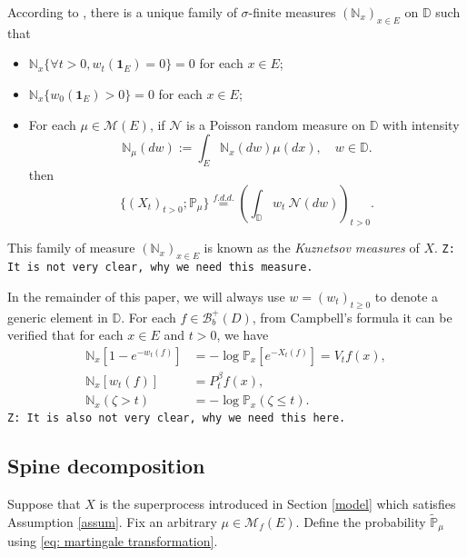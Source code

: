 \documentclass[12pt,a4paper]{amsart}
\numberwithin{equation}{section}
\theoremstyle{plain}
\theoremstyle{definition}
\theoremstyle{remark}
\begin{document}
	According to \cite[Section 8.4]{Li2011Measure-valued}, there is a unique family of $\sigma$-finite measures $(\mathbb N_x)_{x\in E}$ on $\mathbb D$ such that
\begin{itemize}
\item
    $\mathbb N_x \{\forall t > 0, w_t(\mathbf 1_E)=0\} =0$ for each $x\in E$;
\item
    $\mathbb N_x \{ w_0(\mathbf 1_E) > 0\} = 0$ for each $x\in E$;
\item
    For each $\mu \in \mathcal M(E)$, if $\mathcal N$ is a Poisson random measure on $\mathbb D$ with intensity
\[
	\mathbb N_\mu(dw):= \int_E \mathbb N_x(dw)\mu(dx), \quad w\in \mathbb D.
\]
	then
\[
	\{(X_t)_{t> 0};\mathbb P_\mu\}
	\overset{f.d.d.}{=} \left(\int_{\mathbb D} w_t~\mathcal N(dw)\right)_{t> 0}.
\]
\end{itemize}
	This family of measure $(\mathbb N_x)_{x\in E}$ is known as the \emph{Kuznetsov measures} of $X$.
	{\tt Z: It is not very clear, why we need this measure.}

	In the remainder of this paper, we will always use $w = (w_t)_{t\geq 0}$ to denote a generic element in $\mathbb D$.
	For each $f\in \mathcal B_b^+(D)$, from Campbell's formula it can be verified that for each $x\in E$ and $t>0$, we have
\begin{align}\label{eq: kuznetsov Laplace}
 	\mathbb N_x[1-e^{-w_t(f) }]
 	&=-\log \mathbb P_x[e^{-X_t(f)}] = V_t f(x),
 	\\ \mathbb N_x[w_t(f)]
 	&=P_t^{\beta}f(x),
 	\\
 \mathbb N_x(\zeta > t) &= - \log \mathbb P_x(\zeta \leq t).
\end{align}
	{\tt Z: It is also not very clear, why we need this here.}


\subsection{Spine decomposition}
    Suppose that $X$ is the superprocess introduced in Section \ref{model} which satisfies Assumption \ref{assum}.   Fix an arbitrary $\mu\in \mathcal M_f(E)$.  Define the probability $\widetilde {\mathbb P}_\mu$ using \eqref{eq: martingale transformation}.
\end{document}
